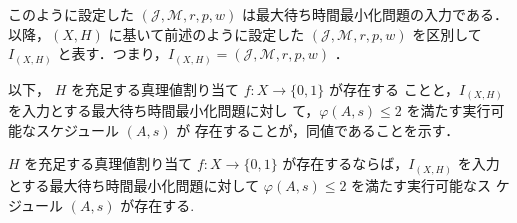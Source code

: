 \documentclass[12pt]{optlab-bachelor}
\begin{document}
このように設定した $(\mathcal{J}, \mathcal{M}, r, p, w)$ は最大待ち時間最小化問題の入力である．以降，$(X,H)$ に基いて前述のように設定した $(\mathcal{J}, \mathcal{M}, r, p, w)$ を区別して $I_{(X,H)}$ と表す．つまり，$I_{(X,H)} = (\mathcal{J}, \mathcal{M}, r, p, w)$ ．

以下， $H$ を充足する真理値割り当て $f : X \to \{0,1\}$ が存在する
ことと，$I_{(X,H)}$ を入力とする最大待ち時間最小化問題に対し
て，$\varphi(A,s) \le 2$ を満たす実行可能なスケジュール $(A,s)$ が
存在することが，同値であることを示す．

\begin{lemma}\label{l_6}
  $H$ を充足する真理値割り当て $f : X \to \{0,1\}$ が存在するならば，$I_{(X,H)}$ を入力とする最大待ち時間最小化問題に対して
  $\varphi(A,s) \le 2$ を満たす実行可能なス
  ケジュール $(A,s)$ が存在する.
\end{lemma}
\end{document}
